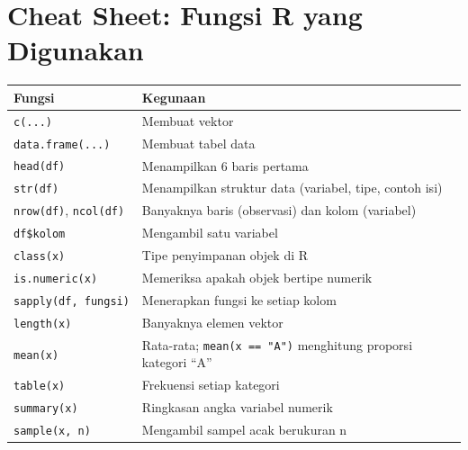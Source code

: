 \documentclass[
  indonesian,
  letterpaper,
]{book}
\newcounter{none} %
\begin{document}
\section{Cheat Sheet: Fungsi R yang
Digunakan}\label{cheat-sheet-fungsi-r-yang-digunakan}

{\def\LTcaptype{none} %
\begin{longtable}[]{@{}
  >{\raggedright\arraybackslash}p{}
  >{\raggedright\arraybackslash}p{}@{}}
\toprule\noalign{}
\begin{minipage}[b]{\linewidth}\raggedright
Fungsi
\end{minipage} & \begin{minipage}[b]{\linewidth}\raggedright
Kegunaan
\end{minipage} \\
\midrule\noalign{}
\endhead
\bottomrule\noalign{}
\endlastfoot
\texttt{c(...)} & Membuat vektor \\
\texttt{data.frame(...)} & Membuat tabel data \\
\texttt{head(df)} & Menampilkan 6 baris pertama \\
\texttt{str(df)} & Menampilkan struktur data (variabel, tipe, contoh
isi) \\
\texttt{nrow(df)}, \texttt{ncol(df)} & Banyaknya baris (observasi) dan
kolom (variabel) \\
\texttt{df\$kolom} & Mengambil satu variabel \\
\texttt{class(x)} & Tipe penyimpanan objek di R \\
\texttt{is.numeric(x)} & Memeriksa apakah objek bertipe numerik \\
\texttt{sapply(df,\ fungsi)} & Menerapkan fungsi ke setiap kolom \\
\texttt{length(x)} & Banyaknya elemen vektor \\
\texttt{mean(x)} & Rata-rata; \texttt{mean(x\ ==\ "A")} menghitung
proporsi kategori ``A'' \\
\texttt{table(x)} & Frekuensi setiap kategori \\
\texttt{summary(x)} & Ringkasan angka variabel numerik \\
\texttt{sample(x,\ n)} & Mengambil sampel acak berukuran n \\
\end{longtable}
}
\end{document}
